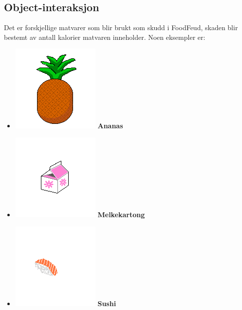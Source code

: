\documentclass[paper=a4]{article}
\begin{document}
\subsection{Object-interaksjon}
Det er forskjellige matvarer som blir brukt som skudd i FoodFeud, skaden blir bestemt av antall kalorier matvaren inneholder. Noen eksempler er:
\\
{\renewcommand\labelitemi{}
\begin{itemize}
	\item \includegraphics[scale = 0.3]{images/Ananas.png} \textbf{Ananas}
	\item \includegraphics[scale = 0.4]{images/Melkekartong.png} \textbf{Melkekartong}
	\item \includegraphics[scale = 0.4]{images/Sushi.png} \textbf{Sushi}
	
\end{itemize}
}
\end{document}
